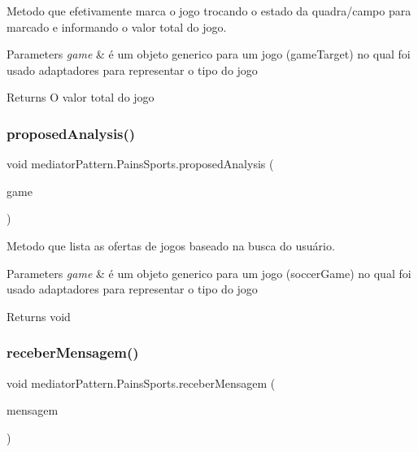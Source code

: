 Metodo que efetivamente marca o jogo trocando o estado da quadra/campo para marcado e informando o valor total do jogo. 


\begin{DoxyParams}{Parameters}
{\em game} & é um objeto generico para um jogo (game\+Target) no qual foi usado adaptadores para representar o tipo do jogo \\
\hline
\end{DoxyParams}
\begin{DoxyReturn}{Returns}
O valor total do jogo 
\end{DoxyReturn}
\mbox{\label{classmediator_pattern_1_1_pains_sports_ad969bb0f7382687dd921268ad4e391ab}} 
\subsubsection{\texorpdfstring{proposedAnalysis()}{proposedAnalysis()}}
{\footnotesize\ttfamily void mediator\+Pattern.\+Pains\+Sports.\+proposed\+Analysis (\begin{DoxyParamCaption}\item[{\mbox{\hyperlink{classtemplate_pattern_1_1soccer_game}{soccer\+Game}}}]{game }\end{DoxyParamCaption})}



Metodo que lista as ofertas de jogos baseado na busca do usuário. 


\begin{DoxyParams}{Parameters}
{\em game} & é um objeto generico para um jogo (soccer\+Game) no qual foi usado adaptadores para representar o tipo do jogo \\
\hline
\end{DoxyParams}
\begin{DoxyReturn}{Returns}
void 
\end{DoxyReturn}
\mbox{\label{classmediator_pattern_1_1_pains_sports_a4b71c6055d71d057663b29fb7be13e64}} 
\subsubsection{\texorpdfstring{receberMensagem()}{receberMensagem()}}
{\footnotesize\ttfamily void mediator\+Pattern.\+Pains\+Sports.\+receber\+Mensagem (\begin{DoxyParamCaption}\item[{String}]{mensagem }\end{DoxyParamCaption})}



